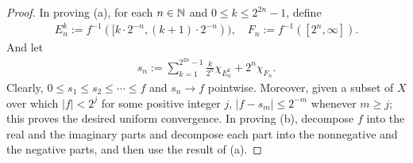 \begin{proof}
    In proving (a), for each $n\in{\mathbb{N}}$ and $0\leq k\leq 2^{2n}-1$, define
    \begin{align*}
        E_n^k:=f^{-1}([k\cdot 2^{-n}, (k+1)\cdot 2^{-n})),\quad F_n:=f^{-1}([2^n, \infty]).
    \end{align*}
    And let
    \begin{align*}
        s_n:=\sum_{k=1}^{2^{2n}-1}\frac{k}{2^n}\chi_{E_n^k}+2^n\chi_{F_n}.
    \end{align*}
    Clearly, $0\leq s_1\leq s_2\leq\cdots\leq f$ and $s_n\rightarrow f$ pointwise.
    Moreover, given a subset of $X$ over which $|f|<2^j$ for some positive integer $j$, $|f-s_m|\leq 2^{-m}$ whenever $m\geq j$; this proves the desired uniform convergence.
    In proving (b), decompose $f$ into the real and the imaginary parts and decompose each part into the nonnegative and the negative parts, and then use the result of (a).
\end{proof}

